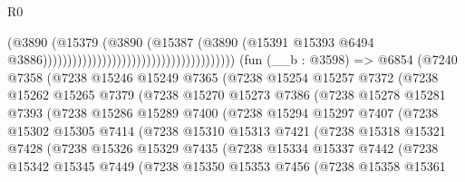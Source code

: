 \begin{lexlean}{R0}
\begin{coremodule}
                                                                      (@3890
                                                                        (@15379
                                                                          (@3890
                                                                            (@15387
                                                                              (@3890
                                                                                (@15391
                                                                                  @15393
                                                                                  @6494
                                                                                  @3886)))))))))))))))))))))))))))))))))))))))
    (fun (__b : @3598) =>
    @6854
      (@7240
        @7358
        (@7238
          @15246
          @15249
          @7365
          (@7238
            @15254
            @15257
            @7372
            (@7238
              @15262
              @15265
              @7379
              (@7238
                @15270
                @15273
                @7386
                (@7238
                  @15278
                  @15281
                  @7393
                  (@7238
                    @15286
                    @15289
                    @7400
                    (@7238
                      @15294
                      @15297
                      @7407
                      (@7238
                        @15302
                        @15305
                        @7414
                        (@7238
                          @15310
                          @15313
                          @7421
                          (@7238
                            @15318
                            @15321
                            @7428
                            (@7238
                              @15326
                              @15329
                              @7435
                              (@7238
                                @15334
                                @15337
                                @7442
                                (@7238
                                  @15342
                                  @15345
                                  @7449
                                  (@7238
                                    @15350
                                    @15353
                                    @7456
                                    (@7238
                                      @15358
                                      @15361

\end{coremodule}
\end{lexlean}
